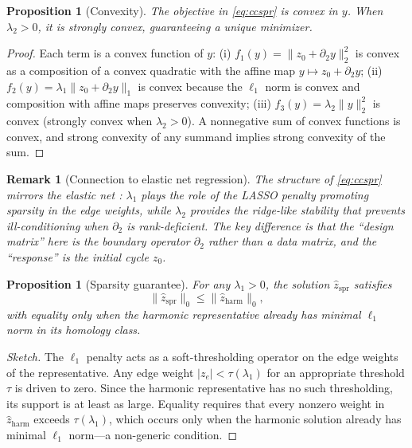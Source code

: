 \documentclass[11pt]{article}
\newtheorem{proposition}[theorem]{Proposition}
\newtheorem{remark}[theorem]{Remark}
\begin{document}
\begin{proposition}[Convexity]\label{prop:convex}
The objective in \eqref{eq:ccspr} is convex in $y$.
When $\lambda_2 > 0$, it is strongly convex, guaranteeing a unique minimizer.
\end{proposition}

\begin{proof}
Each term is a convex function of $y$:
(i) $f_1(y) = \|z_0 + \partial_2 y\|_2^2$ is convex as a composition of a convex quadratic with the affine map $y \mapsto z_0 + \partial_2 y$;
(ii) $f_2(y) = \lambda_1 \|z_0 + \partial_2 y\|_1$ is convex because the $\ell_1$ norm is convex and composition with affine maps preserves convexity;
(iii) $f_3(y) = \lambda_2 \|y\|_2^2$ is convex (strongly convex when $\lambda_2 > 0$).
A nonnegative sum of convex functions is convex, and strong convexity of any summand implies strong convexity of the sum.
\end{proof}

\begin{remark}[Connection to elastic net regression]\label{rem:elasticnet}
The structure of \eqref{eq:ccspr} mirrors the elastic net \cite{zou2005elasticnet}: $\lambda_1$ plays the role of the LASSO penalty promoting sparsity in the edge weights, while $\lambda_2$ provides the ridge-like stability that prevents ill-conditioning when $\partial_2$ is rank-deficient.
The key difference is that the ``design matrix'' here is the boundary operator $\partial_2$ rather than a data matrix, and the ``response'' is the initial cycle $z_0$.
\end{remark}

\begin{proposition}[Sparsity guarantee]\label{prop:sparsity}
For any $\lambda_1 > 0$, the solution $\hat{z}_{\mathrm{spr}}$ satisfies
\[
\|\hat{z}_{\mathrm{spr}}\|_0 \le \|\hat{z}_{\mathrm{harm}}\|_0,
\]
with equality only when the harmonic representative already has minimal $\ell_1$ norm in its homology class.
\end{proposition}

\begin{proof}[Sketch]
The $\ell_1$ penalty acts as a soft-thresholding operator on the edge weights of the representative.
Any edge weight $|z_e| < \tau(\lambda_1)$ for an appropriate threshold $\tau$ is driven to zero.
Since the harmonic representative has no such thresholding, its support is at least as large.
Equality requires that every nonzero weight in $\hat{z}_{\mathrm{harm}}$ exceeds $\tau(\lambda_1)$, which occurs only when the harmonic solution already has minimal $\ell_1$ norm---a non-generic condition.
\end{proof}
\end{document}

